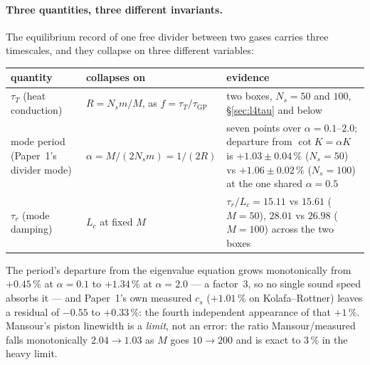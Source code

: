 \documentclass[11pt,a4paper]{article}
\begin{document}
\paragraph{Three quantities, three different invariants.} The equilibrium record of one free divider
between two gases carries three timescales, and they collapse on three different variables:
\begin{center}\small
\begin{tabular}{@{}lll@{}}
\toprule
quantity & collapses on & evidence \\
\midrule
$\tau_T$ (heat conduction) & $R = N_s m/M$, as $f = \tau_T/\tau_{\mathrm{GP}}$ & two boxes, $N_s = 50$ and $100$, \S\ref{sec:l4tau} and below \\
mode period (Paper~1's divider mode) & $\alpha = M/(2N_s m) = 1/(2R)$ & seven points over $\alpha = 0.1$--$2.0$; departure from $\cot K = \alpha K$ is $+1.03 \pm 0.04\,\%$ ($N_s = 50$) vs $+1.06 \pm 0.02\,\%$ ($N_s = 100$) at the one shared $\alpha = 0.5$ \\
$\tau_r$ (mode damping) & $L_c$ at fixed $M$ & $\tau_r/L_c = 15.11$ vs $15.61$ ($M = 50$), $28.01$ vs $26.98$ ($M = 100$) across the two boxes \\
\bottomrule
\end{tabular}
\end{center}
The period's departure from the eigenvalue equation grows monotonically from $+0.45\,\%$ at
$\alpha = 0.1$ to $+1.34\,\%$ at $\alpha = 2.0$ --- a factor~3, so no single sound speed absorbs it
--- and Paper~1's own measured $c_s$ ($+1.01\,\%$ on Kolafa--Rottner) leaves a residual of $-0.55$
to $+0.33\,\%$: the fourth independent appearance of that $+1\,\%$. Mansour's piston linewidth is a
\emph{limit}, not an error: the ratio Mansour/measured falls monotonically $2.04 \to 1.03$ as $M$
goes $10 \to 200$ and is exact to $3\,\%$ in the heavy limit.
\end{document}
